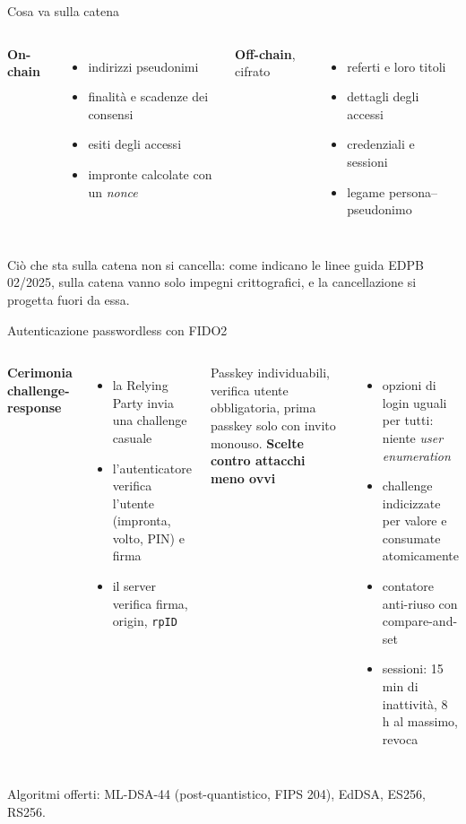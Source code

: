 \documentclass[11pt,aspectratio=169]{beamer}
\begin{document}
\begin{frame}{Cosa va sulla catena}
\begin{columns}[T]
\textbf{On-chain}
\begin{itemize}
  \item indirizzi pseudonimi
  \item finalità e scadenze dei consensi
  \item esiti degli accessi
  \item impronte calcolate con un \emph{nonce}
\end{itemize}
\textbf{Off-chain}, cifrato
\begin{itemize}
  \item referti e loro titoli
  \item dettagli degli accessi
  \item credenziali e sessioni
  \item legame persona--pseudonimo
\end{itemize}
\end{columns}

\bigskip
Ciò che sta sulla catena non si cancella: come indicano le linee guida EDPB 02/2025, sulla catena vanno solo impegni crittografici, e la cancellazione si progetta fuori da essa.
\end{frame}

\begin{frame}{Autenticazione passwordless con FIDO2}
\begin{columns}[T]
\textbf{Cerimonia challenge-response}
\begin{itemize}
  \item la Relying Party invia una challenge casuale
  \item l'autenticatore verifica l'utente (impronta, volto, PIN) e firma
  \item il server verifica firma, origin, \texttt{rpID}
\end{itemize}
\small Passkey individuabili, verifica utente obbligatoria, prima passkey solo con invito monouso.
\textbf{Scelte contro attacchi meno ovvi}
\begin{itemize}
  \item opzioni di login uguali per tutti: niente \emph{user enumeration}
  \item challenge indicizzate per valore e consumate atomicamente
  \item contatore anti-riuso con compare-and-set
  \item sessioni: 15 min di inattività, 8 h al massimo, revoca
\end{itemize}
\end{columns}

\medskip
\centering\small Algoritmi offerti: \alert{ML-DSA-44} (post-quantistico, FIPS 204), EdDSA, ES256, RS256.
\end{frame}
\end{document}
